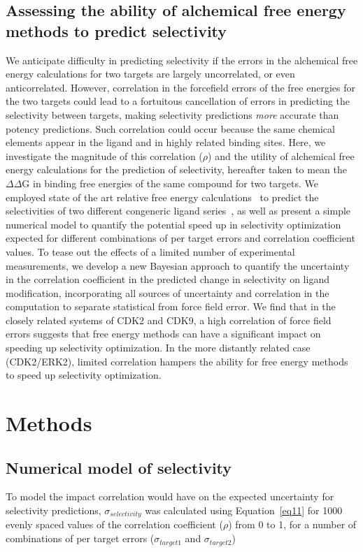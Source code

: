 \documentclass[phd,tocprelim]{cornell}
\begin{document}
\subsection{Assessing the ability of alchemical free energy methods to predict selectivity}
We anticipate difficulty in predicting selectivity if the errors in the alchemical free energy calculations for two targets are largely uncorrelated, or even anticorrelated. However, correlation in the forcefield errors of the free energies for the two targets could lead to a fortuitous cancellation of errors in predicting the selectivity between targets, making selectivity predictions \emph{more} accurate than potency predictions. Such correlation could occur because the same chemical elements appear in the ligand and in highly related binding sites. 
Here, we investigate the magnitude of this correlation ($\rho$) and the utility of alchemical free energy calculations for the prediction of selectivity, hereafter taken to mean the $\Delta \Delta$G in binding free energies of the same compound for two targets. We employed state of the art relative free energy calculations~\citep{Wang:J.Am.Chem.Soc.:2015,Abel:2017jt} to predict the selectivities of two different congeneric ligand series~\citep{Shao2013-oe, Blake2016-su}, as well as present a simple numerical model to quantify the potential speed up in selectivity optimization expected for different combinations of per target errors and correlation coefficient values. To tease out the effects of a limited number of experimental measurements, we develop a new Bayesian approach to quantify the uncertainty in the correlation coefficient in the predicted change in selectivity on ligand modification, incorporating all sources of uncertainty and correlation in the computation to separate statistical from force field error. We find that in the closely related systems of CDK2 and CDK9, a high correlation of force field errors suggests that free energy methods can have a significant impact on speeding up selectivity optimization. In the more distantly related case (CDK2/ERK2), limited correlation hampers the ability for free energy methods to speed up selectivity optimization. 

\section{Methods}

\subsection{Numerical model of selectivity}
To model the impact correlation would have on the expected uncertainty for selectivity predictions, $\sigma_{selectivity}$ was calculated using Equation~\ref{eq11} for 1000 evenly spaced values of the correlation coefficient ($\rho$) from 0 to 1, for a number of combinations of per target errors ($\sigma_{target1}$ and $\sigma_{target2}$) 
\end{document}
